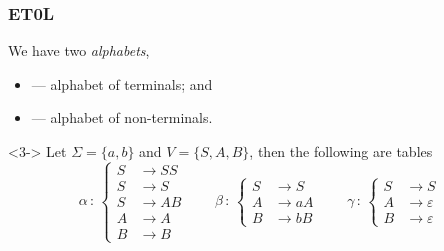 \documentclass[11pt]{beamer}
\begin{document}
\begin{frame}
\frametitle{ET0L}

We have two \emph{alphabets},

\begin{itemize}
	\item \makebox[0.9em][l]{$\Sigma$} --- alphabet of terminals; and
	\item {}      --- alphabet of non-terminals.
\end{itemize}

\begin{example}<3->
Let $\Sigma = \{a,b\}$ and $V = \{S,A,B\}$, then the following are tables
\[
\alpha \, : \,
	\left\{
	\begin{aligned}
		S &\to SS\\
		S &\to S\\
		S &\to AB\\
		A &\to A\\
		B &\to B
	\end{aligned}
	\right.
	\qquad
\beta \, : \,
	\left\{
	\begin{aligned}
		S &\to S\\
		A &\to aA\\
		B &\to bB
	\end{aligned}
	\right.
	\qquad
\gamma \, : \,
	\left\{
	\begin{aligned}
		S &\to S \\
		A &\to \varepsilon \\
		B &\to \varepsilon
	\end{aligned}
	\right.
\]
\end{example}

\end{frame}
\end{document}

